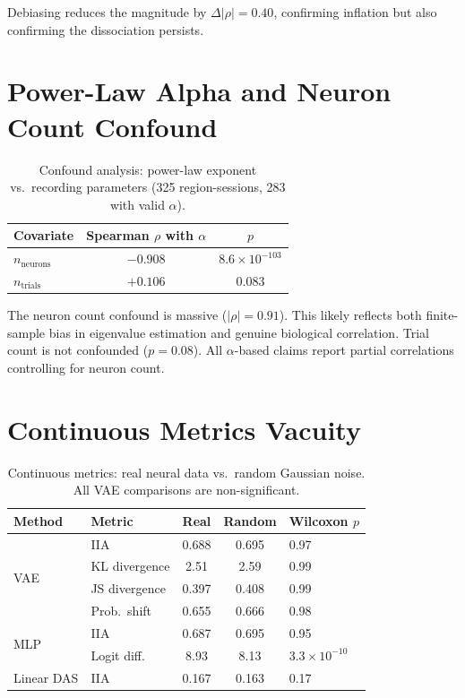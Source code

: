 \documentclass{article}
\begin{document}
Debiasing reduces the magnitude by $\Delta|\rho| = 0.40$, confirming inflation but also confirming the dissociation persists.


\section{Power-Law Alpha and Neuron Count Confound}
\label{app:alpha_bias}

\begin{table}[h]
\centering
\small
\caption{Confound analysis: power-law exponent vs.\ recording parameters (325 region-sessions, 283 with valid $\alpha$).}
\label{tab:alpha_confound}
\begin{tabular}{@{}lcc@{}}
\toprule
\textbf{Covariate} & \textbf{Spearman $\rho$ with $\alpha$} & \textbf{$p$} \\
\midrule
$n_{\text{neurons}}$ & $-0.908$ & $8.6 \times 10^{-103}$ \\
$n_{\text{trials}}$ & $+0.106$ & $0.083$ \\
\bottomrule
\end{tabular}
\end{table}

The neuron count confound is massive ($|\rho| = 0.91$). This likely reflects both finite-sample bias in eigenvalue estimation \citep{chun2025dimensionality} and genuine biological correlation. Trial count is not confounded ($p = 0.08$). All $\alpha$-based claims report partial correlations controlling for neuron count.


\section{Continuous Metrics Vacuity}
\label{app:continuous_metrics}

\begin{table}[h]
\centering
\small
\caption{Continuous metrics: real neural data vs.\ random Gaussian noise. All VAE comparisons are non-significant.}
\label{tab:continuous_full}
\begin{tabular}{llccl}
\toprule
Method & Metric & Real & Random & Wilcoxon $p$ \\
\midrule
\multirow{4}{*}{VAE} & IIA & 0.688 & 0.695 & 0.97 \\
& KL divergence & 2.51 & 2.59 & 0.99 \\
& JS divergence & 0.397 & 0.408 & 0.99 \\
& Prob.\ shift & 0.655 & 0.666 & 0.98 \\
\midrule
\multirow{2}{*}{MLP} & IIA & 0.687 & 0.695 & 0.95 \\
& Logit diff.\ & 8.93 & 8.13 & $3.3 \times 10^{-10}$ \\
\midrule
Linear DAS & IIA & 0.167 & 0.163 & 0.17 \\
\bottomrule
\end{tabular}
\end{table}
\end{document}
